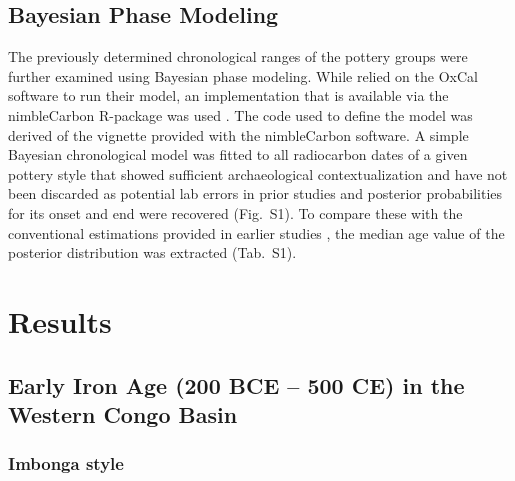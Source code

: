 \documentclass[smallextended,natbib]{svjour3}       %
\begin{document}
\subsection*{Bayesian Phase Modeling}

The previously determined chronological ranges of the pottery groups \citep{Seidensticker.2021e, Seidensticker.2021} were further examined using Bayesian phase modeling. While \citet{Crema.2020a} relied on the OxCal software to run their model, an implementation that is available via the nimbleCarbon R-package was used \citep{Crema.2021a,Crema.2021b}. The code used to define the model was derived of the vignette provided with the nimbleCarbon software. A simple Bayesian chronological model was fitted to all radiocarbon dates of a given pottery style that showed sufficient archaeological contextualization and have not been discarded as potential lab errors in prior studies \citep[9]{Seidensticker.2021} and posterior probabilities for its onset and end were recovered (Fig.~S1). To compare these with the conventional estimations provided in earlier studies \citep[\url{https://github.com/dirkseidensticker/aSCAC};][Data S2]{Seidensticker.2021}, the median age value of the posterior distribution was extracted (Tab.~S1).

\section*{Results}

\subsection*{Early Iron Age (200 BCE – 500 CE) in the Western Congo Basin}

\subsubsection*{Imbonga style}
\end{document}
